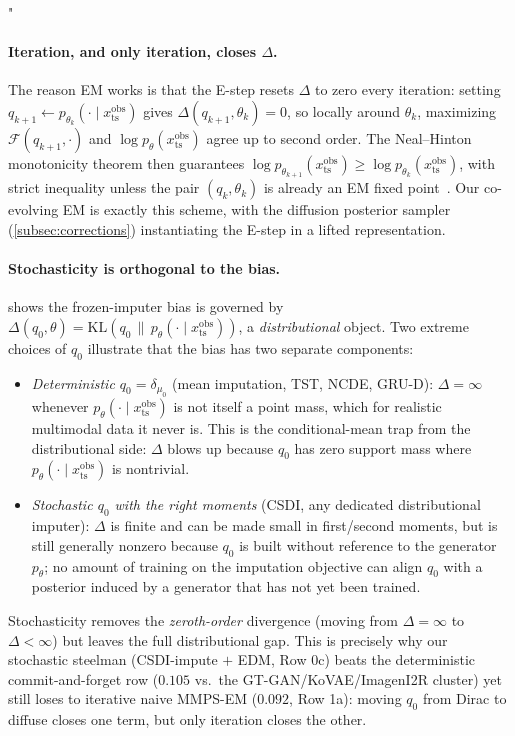 "\documentclass{article}
\theoremstyle{plain}
\theoremstyle{definition}
\theoremstyle{remark}
\newcommand{\xts}{x_{\mathrm{ts}}}
\begin{document}
\paragraph{Iteration, and only iteration, closes $\Delta$.}
The reason EM works is that the E-step resets $\Delta$ to zero every iteration: setting $q_{k+1} \leftarrow p_{\theta_k}(\cdot\mid\xts^{\mathrm{obs}})$ gives $\Delta(q_{k+1}, \theta_k) = 0$, so locally around $\theta_k$, maximizing $\mathcal{F}(q_{k+1}, \cdot)$ and $\log p_\theta(\xts^{\mathrm{obs}})$ agree up to second order. The Neal--Hinton monotonicity theorem then guarantees $\log p_{\theta_{k+1}}(\xts^{\mathrm{obs}}) \geq \log p_{\theta_k}(\xts^{\mathrm{obs}})$, with strict inequality unless the pair $(q_k, \theta_k)$ is already an EM fixed point~\citep{neal1998em,dempster1977em}. Our co-evolving EM is exactly this scheme, with the diffusion posterior sampler (\cref{subsec:corrections}) instantiating the E-step in a lifted representation.

\paragraph{Stochasticity is orthogonal to the bias.}
 shows the frozen-imputer bias is governed by $\Delta(q_0,\theta) = \mathrm{KL}(q_0 \,\|\, p_\theta(\cdot\mid\xts^{\mathrm{obs}}))$, a \emph{distributional} object. Two extreme choices of $q_0$ illustrate that the bias has two separate components:
\begin{itemize}
\setlength{\itemsep}{0pt}
\item \emph{Deterministic $q_0 = \delta_{\mu_0}$} (mean imputation, TST, NCDE, GRU-D): $\Delta = \infty$ whenever $p_\theta(\cdot\mid\xts^{\mathrm{obs}})$ is not itself a point mass, which for realistic multimodal data it never is. This is the conditional-mean trap from the distributional side: $\Delta$ blows up because $q_0$ has zero support mass where $p_\theta(\cdot\mid\xts^{\mathrm{obs}})$ is nontrivial.
\item \emph{Stochastic $q_0$ with the right moments} (CSDI, any dedicated distributional imputer): $\Delta$ is finite and can be made small in first/second moments, but is still generally nonzero because $q_0$ is built without reference to the generator $p_\theta$; no amount of training on the imputation objective can align $q_0$ with a posterior induced by a generator that has not yet been trained.
\end{itemize}
Stochasticity removes the \emph{zeroth-order} divergence (moving from $\Delta = \infty$ to $\Delta < \infty$) but leaves the full distributional gap. This is precisely why our stochastic steelman (CSDI-impute $+$ EDM, Row 0c) beats the deterministic commit-and-forget row ($0.105$ vs.\ the GT-GAN/KoVAE/ImagenI2R cluster) yet still loses to iterative naive MMPS-EM ($0.092$, Row 1a): moving $q_0$ from Dirac to diffuse closes one term, but only iteration closes the other.
\end{document}
